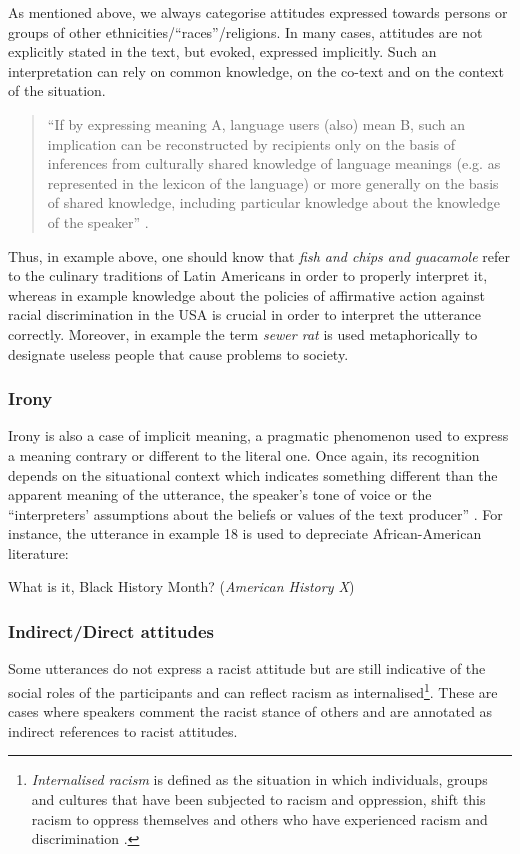\documentclass[output=paper]{LSP/langsci}
\begin{document}
As mentioned above, we always categorise attitudes expressed towards persons or groups of other ethnicities/“races”/religions. In many cases, attitudes are not explicitly stated in the text, but evoked, expressed implicitly. Such an interpretation can rely on common knowledge, on the co-text and on the context of the situation.

\begin{quote}
“If by expressing meaning A, language users (also) mean B, such an implication can be reconstructed by recipients only on the basis of inferences from culturally shared knowledge of language meanings (e.g. as represented in the lexicon of the language) or more generally on the basis of shared knowledge, including particular knowledge about the knowledge of the speaker” \citep[168]{Dijk1995}.
\end{quote}

Thus, in example  above, one should know that \textit{fish and chips and guacamole} refer to the culinary traditions of Latin Americans in order to properly interpret it, whereas in example  knowledge about the policies of affirmative action against racial discrimination in the USA is crucial in order to interpret the utterance correctly. Moreover, in example  the term \textit{sewer rat} is used metaphorically to designate useless people that cause problems to society.

\subsubsection{Irony}

Irony is also a case of implicit meaning, a pragmatic phenomenon used to express a meaning contrary or different to the literal one. Once again, its recognition depends on the situational context which indicates something different than the apparent meaning of the utterance, the speaker's tone of voice or the “interpreters' assumptions about the beliefs or values of the text producer”  \citep[123]{Fairclough1992}. For instance, the utterance in example 18 is used to depreciate African-American literature:

\ea \label{ex:2:18} What is it, Black History Month? (\textit{American History X})
\z

\subsubsection{Indirect/Direct attitudes}
Some utterances do not express a racist attitude but are still indicative of the social roles of the participants and can reflect racism as internalised\footnote{\textit{Internalised racism} is defined as the situation in which individuals, groups and cultures that have been subjected to racism and oppression, shift this racism to oppress themselves and others who have experienced racism and discrimination \citep[92]{Lawrence2002}.}. These are cases where speakers comment the racist stance of others and are annotated as indirect references to racist attitudes.\newline
\end{document}
